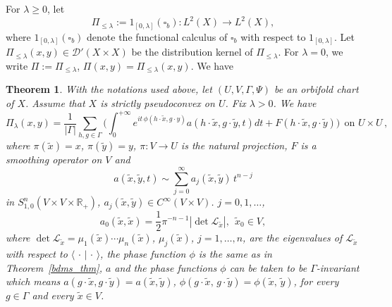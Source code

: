 \documentclass{article}
\newtheorem{theorem}{Theorem}[section]
\newcommand{\mcd}{\mathcal D}
\newcommand{\To}{\rightarrow}
\begin{document}
For $\lambda\geq0$, let 
\[\Pi_{\leq\lambda}:=1_{[0,\lambda]}(\square_b): L^2(X)\rightarrow L^2(X),\]
where $1_{[0,\lambda]}(\square_b)$ denote the functional calculus of $\square_b$ with respect to $1_{[0,\lambda]}$. 
Let $\Pi_{\leq\lambda}(x,y)\in\mcd'(X \times X)$ be the distribution kernel of $\Pi_{\leq\lambda}$. For $\lambda=0$, we write $\Pi:=\Pi_{\leq\lambda}$, $\Pi(x,y)=\Pi_{\leq\lambda}(x,y)$.
We have  

\begin{theorem}\label{t-gue251130yyd}
With the notations used above, let $(U, V, \Gamma, \Psi)$
be an orbifold chart of $X$. Assume that $X$ is strictly pseudoconvex on $U$. Fix $\lambda>0$. We have 
		\begin{equation}\label{e-gue251130yyda}
        \Pi_{\lambda}(x,y)=\frac{1}{|\Gamma|}\sum_{h,g\in\Gamma}\Bigr(\int _0^{+\infty}e^{it\, \phi(h\cdot\tilde{x},g\cdot y)}a(h\cdot\tilde{x},g\cdot \tilde{y},t)dt+F(h\cdot\tilde x,g\cdot\tilde y)\Bigr)\ \ \mbox{on $U\times U$} \,,\end{equation}
		where $\pi(\widetilde x)=x$, $\pi(\widetilde y)=y$, $\pi: V\To U$ is the natural projection, $F$ is a  smoothing operator on $V$ and 
		\[a( \widetilde{x}, \widetilde{y},t)\sim\sum^\infty_{j=0}a_j( \widetilde{x},  \widetilde{y})\,t^{n-j}\]
		in $S^{n}_{1, 0}(V\times V\times\mathbb{R}_+)$,
        $a_j( \widetilde{x},  \widetilde{y})\in C^\infty(V\times V)$. $j=0,1,\ldots$, 
        \begin{equation}\label{e-gue251210ycda}
        a_0(\widetilde{x},  \widetilde{x})=\frac{1}{2}\pi^{-n-1}|\det\mathcal{L}_{\widetilde{x}}|,\ \ \widetilde{x}_0\in V,\end{equation}
        where $\det\mathcal{L}_{\widetilde{x}}=\mu_1(\widetilde x)\cdots\mu_n(\widetilde x)$, $\mu_j(\widetilde x)$, $j=1,\ldots,n$, are the eigenvalues of 
        $\mathcal{L}_{\widetilde{x}}$ with respect to $\langle\,\cdot\,|\,\cdot\,\rangle$, 
		 the phase function $\phi$ is the same as in Theorem~\ref{bdms_thm},
  $a$ and the phase functions $\phi$ can be taken to be $\Gamma$-invariant which means 
  $a(g\cdot\tilde{x},g\cdot\tilde{y})=a(\tilde{x},\tilde{y})$, $\phi(g\cdot\tilde{x},\,g\cdot\tilde{y})=\phi(\tilde{x},\,\tilde{y})$, for every $g\in\Gamma$ and every $\tilde x\in V$.
\end{theorem}
\end{document}
